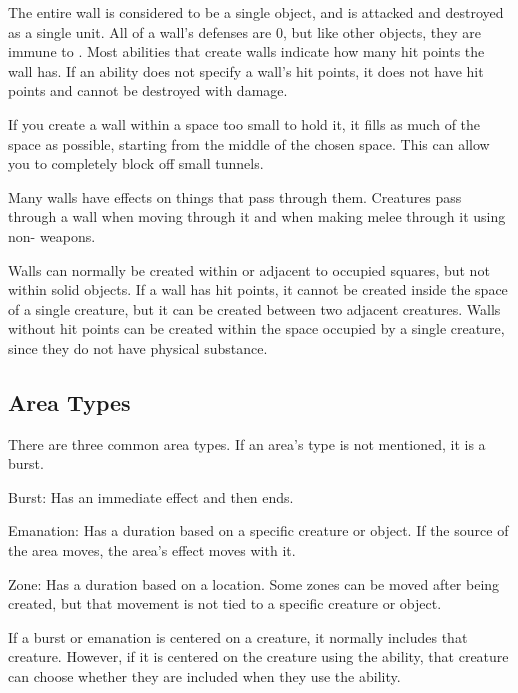     The entire wall is considered to be a single object, and is attacked and destroyed as a single unit.
    All of a wall's defenses are 0, but like other objects, they are immune to .
    Most abilities that create walls indicate how many hit points the wall has.
    If an ability does not specify a wall's hit points, it does not have hit points and cannot be destroyed with damage.

    If you create a wall within a space too small to hold it, it fills as much of the space as possible, starting from the middle of the chosen space.
    This can allow you to completely block off small tunnels.

    Many walls have effects on things that pass through them.
    Creatures pass through a wall when moving through it and when making melee  through it using non- weapons.

    Walls can normally be created within or adjacent to occupied squares, but not within solid objects.
    If a wall has hit points, it cannot be created inside the space of a single creature, but it can be created between two adjacent creatures.
    Walls without hit points can be created within the space occupied by a single creature, since they do not have physical substance.

  \subsection{Area Types}\label{Area Types}
    There are three common area types.
    If an area's type is not mentioned, it is a burst.
    \begin{raggeditemize}
      \item Burst: Has an immediate effect and then ends.
      \item Emanation: Has a duration based on a specific creature or object. If the source of the area moves, the area's effect moves with it.
      \item Zone: Has a duration based on a location. Some zones can be moved after being created, but that movement is not tied to a specific creature or object.
    \end{raggeditemize}

    If a burst or emanation is centered on a creature, it normally includes that creature.
    However, if it is centered on the creature using the ability, that creature can choose whether they are included when they use the ability.

